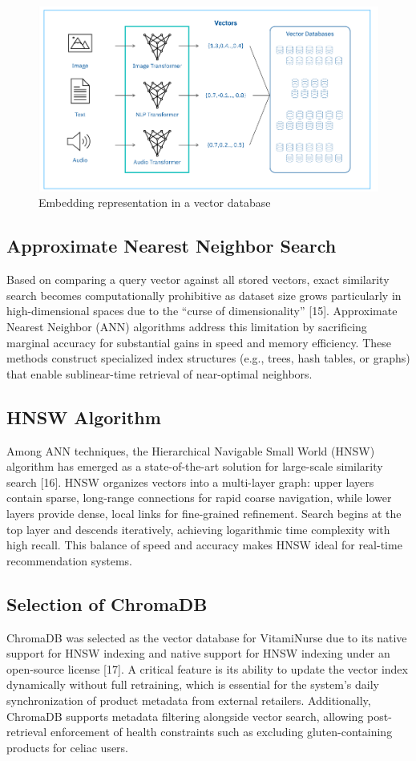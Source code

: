 \begin{figure}[H]
\centering
\includegraphics[scale=0.45]{images/vectorDB.png}
\caption{Embedding representation in a vector database}
\label{fig:vectorDB}
\end{figure}

\subsection{Approximate Nearest Neighbor Search}
Based on comparing a query vector against all stored vectors, exact
similarity search becomes computationally prohibitive as dataset size
grows particularly in high-dimensional spaces due to the “curse of dimensionality” [15].
Approximate Nearest Neighbor (ANN) algorithms address this limitation
by sacrificing marginal accuracy for substantial gains in speed and memory
efficiency. These methods construct specialized index structures (e.g.,
trees, hash tables, or graphs) that enable sublinear-time retrieval of
near-optimal neighbors.
\subsection{HNSW Algorithm}
Among ANN techniques, the Hierarchical Navigable Small World (HNSW)
algorithm has emerged as a state-of-the-art solution for large-scale similarity search [16]. HNSW organizes vectors into a multi-layer graph: upper
layers contain sparse, long-range connections for rapid coarse navigation,
while lower layers provide dense, local links for fine-grained refinement.
Search begins at the top layer and descends iteratively, achieving logarithmic time complexity with high recall. This balance of speed and
accuracy makes HNSW ideal for real-time recommendation systems.
\subsection{Selection of ChromaDB}
ChromaDB was selected as the vector database for VitamiNurse due to
its native support for HNSW indexing and native support for HNSW
indexing under an open-source license [17]. A critical feature is its ability
to update the vector index dynamically without full retraining, which is
essential for the system’s daily synchronization of product metadata from
external retailers. Additionally, ChromaDB supports metadata filtering
alongside vector search, allowing post-retrieval enforcement of health
constraints such as excluding gluten-containing products for celiac users.

